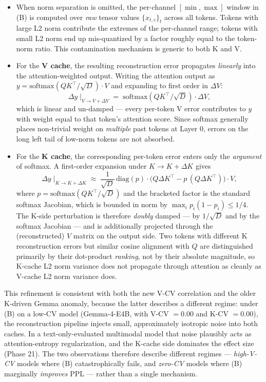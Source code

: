 \documentclass[
]{article}
\providecommand{\tightlist}{%
  \setlength{\itemsep}{0pt}\setlength{\parskip}{0pt}}
\begin{document}
\begin{itemize}
\tightlist
\item
  When norm separation is omitted, the per-channel \([\min, \max]\)
  window in (B) is computed over \emph{raw} tensor values
  \(\{x_{t, c}\}_{t}\) across all tokens. Tokens with large L2 norm
  contribute the extremes of the per-channel range; tokens with small L2
  norm end up mis-quantized by a factor roughly equal to the token-norm
  ratio. This contamination mechanism is generic to both K and V.
\item
  For the \textbf{V cache}, the resulting reconstruction error
  propagates \emph{linearly} into the attention-weighted output. Writing
  the attention output as
  \(y = \mathrm{softmax}(QK^\top / \sqrt{D}) \cdot V\) and expanding to
  first order in \(\Delta V\): \[
  \Delta y \;\big|_{V \to V + \Delta V} \;=\; \mathrm{softmax}(QK^\top / \sqrt{D}) \cdot \Delta V,
  \] which is linear and un-damped --- every per-token V error
  contributes to \(y\) with weight equal to that token's attention
  score. Since softmax generally places non-trivial weight on
  \emph{multiple} past tokens at Layer 0, errors on the long left tail
  of low-norm tokens are not absorbed.
\item
  For the \textbf{K cache}, the corresponding per-token error enters
  only the \emph{argument} of softmax. A first-order expansion under
  \(K \to K + \Delta K\) gives \[
  \Delta y \;\big|_{K \to K + \Delta K} \;\approx\; \frac{1}{\sqrt{D}}\,\mathrm{diag}(p) \cdot \bigl(Q \Delta K^\top - p\,(Q \Delta K^\top)\bigr) \cdot V,
  \] where \(p = \mathrm{softmax}(QK^\top / \sqrt{D})\) and the
  bracketed factor is the standard softmax Jacobian, which is bounded in
  norm by \(\max_i p_i (1 - p_i) \leq 1/4\). The K-side perturbation is
  therefore \emph{doubly} damped --- by \(1/\sqrt{D}\) and by the
  softmax Jacobian --- and is additionally projected through the
  (reconstructed) \(V\) matrix on the output side. Two tokens with
  different K reconstruction errors but similar cosine alignment with
  \(Q\) are distinguished primarily by their dot-product \emph{ranking},
  not by their absolute magnitude, so K-cache L2 norm variance does not
  propagate through attention as cleanly as V-cache L2 norm variance
  does.
\end{itemize}

This refinement is consistent with both the new V-CV correlation and the
older K-driven Gemma anomaly, because the latter describes a different
regime: under (B) on a low-CV model (Gemma-4-E4B, with V-CV \(= 0.00\)
and K-CV \(= 0.00\)), the reconstruction pipeline injects small,
approximately isotropic noise into both caches. In a text-only-evaluated
multimodal model that noise plausibly acts as attention-entropy
regularization, and the K-cache side dominates the effect size (Phase
21). The two observations therefore describe different regimes ---
\emph{high-V-CV} models where (B) catastrophically fails, and
\emph{zero-CV} models where (B) marginally \emph{improves} PPL ---
rather than a single mechanism.
\end{document}

